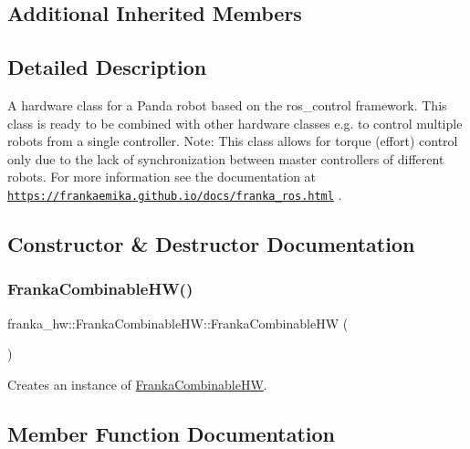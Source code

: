 \subsection*{Additional Inherited Members}


\subsection{Detailed Description}
A hardware class for a Panda robot based on the ros\+\_\+control framework. This class is ready to be combined with other hardware classes e.\+g. to control multiple robots from a single controller. Note\+: This class allows for torque (effort) control only due to the lack of synchronization between master controllers of different robots. For more information see the documentation at \href{https://frankaemika.github.io/docs/franka_ros.html}{\tt https\+://frankaemika.\+github.\+io/docs/franka\+\_\+ros.\+html} . 

\subsection{Constructor \& Destructor Documentation}
\mbox{\label{classfranka__hw_1_1_franka_combinable_h_w_aac256f1d5ce4757f146c468cb841153a}} 
\subsubsection{\texorpdfstring{Franka\+Combinable\+H\+W()}{FrankaCombinableHW()}}
{\footnotesize\ttfamily franka\+\_\+hw\+::\+Franka\+Combinable\+H\+W\+::\+Franka\+Combinable\+HW (\begin{DoxyParamCaption}{ }\end{DoxyParamCaption})}

Creates an instance of \hyperlink{classfranka__hw_1_1_franka_combinable_h_w}{Franka\+Combinable\+HW}. 

\subsection{Member Function Documentation}
\mbox{\label{classfranka__hw_1_1_franka_combinable_h_w_aa2a84c1da5161ddb38e33f112c8850a7}} 
